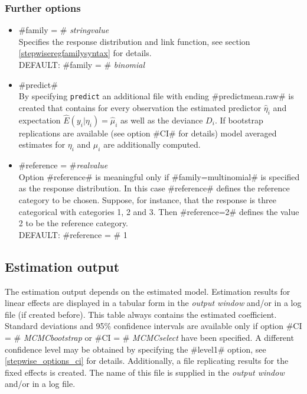 \subsubsection*{Further options}
\label{stepwisereg_further_options}

\begin{itemize}
\item #family = # {\em stringvalue} \\
 Specifies the response distribution and link function, see section \ref{stepwiseregfamilysyntax} for details. \\
DEFAULT: #family = # {\em binomial}
\item  #predict# \\
By specifying {\tt predict} an
additional file with ending #predictmean.raw# is created that contains for
every observation the estimated predictor $\hat \eta_i$ and
expectation $\hat E(y_i | \eta_i) = \hat \mu_i$ as well as the
deviance $D_i$.  If bootstrap replications are available (see option #CI# for details) model averaged estimates for $\eta_i$ and $\mu_i$
are additionally computed.
\item #reference = #{\em realvalue} \\
Option #reference# is meaningful only if  #family=multinomial# is
specified as the response distribution. In this case #reference#
defines the reference category to be chosen. Suppose, for
instance, that the response is three categorical with categories
1, 2 and 3. Then #reference=2# defines the value 2 to be the reference category. \\
DEFAULT: #reference = # 1
\end{itemize}










\subsection{Estimation output}

The estimation output depends on the estimated
model. Estimation results for linear effects are displayed in a
tabular form in the {\em output window} and/or in a log file (if
created before). This table always contains the estimated coefficient.
Standard deviations and  95\% confidence intervals are available only
if option #CI = # {\em MCMCbootstrap} or
#CI = # {\em MCMCselect} have been specified.
A different confidence level may be obtained by specifying the
#level1# option, see \autoref{stepwise_options_ci} for details.
Additionally, a file replicating results for the fixed effects is
created. The name of this file is supplied in the {\em output
window} and/or in a log file.

